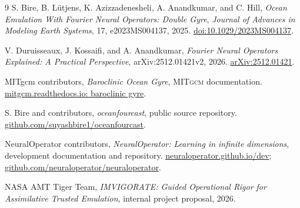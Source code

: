 \documentclass[11pt]{article}
\newcommand{\MITgcm}{\textsc{MITgcm}}
\begin{document}
\clearpage
\begin{thebibliography}{9}
S. Bire, B. L\"utjens, K. Azizzadenesheli, A. Anandkumar, and C. Hill,
\emph{Ocean Emulation With Fourier Neural Operators: Double Gyre},
\emph{Journal of Advances in Modeling Earth Systems}, 17, e2023MS004137, 2025.
\href{https://doi.org/10.1029/2023MS004137}{doi:10.1029/2023MS004137}.

V. Duruisseaux, J. Kossaifi, and A. Anandkumar,
\emph{Fourier Neural Operators Explained: A Practical Perspective},
arXiv:2512.01421v2, 2026.
\href{https://arxiv.org/abs/2512.01421}{arXiv:2512.01421}.

MITgcm contributors, \emph{Baroclinic Ocean Gyre}, \MITgcm{} documentation.
\href{https://mitgcm.readthedocs.io/en/latest/examples/baroclinic_gyre/baroclinic_gyre.html}
{mitgcm.readthedocs.io: baroclinic gyre}.

S. Bire and contributors, \emph{oceanfourcast}, public source repository.
\href{https://github.com/suyashbire1/oceanfourcast}
{github.com/suyashbire1/oceanfourcast}.

NeuralOperator contributors, \emph{NeuralOperator: Learning in infinite dimensions},
development documentation and repository.
\href{https://neuraloperator.github.io/dev/index.html}{neuraloperator.github.io/dev};
\href{https://github.com/neuraloperator/neuraloperator}
{github.com/neuraloperator/neuraloperator}.

NASA AMT Tiger Team,
\emph{IMVIGORATE: Guided Operational Rigor for Assimilative Trusted Emulation},
internal project proposal, 2026.
\end{thebibliography}
\end{document}
